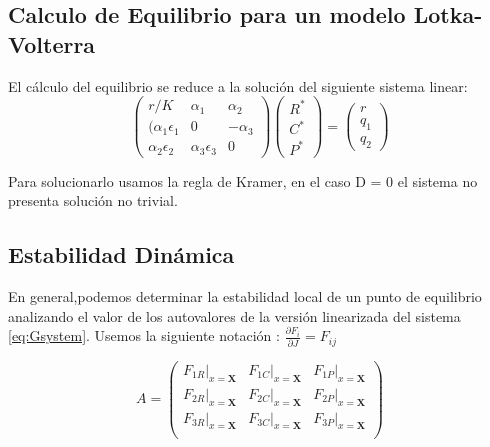 \subsection{Calculo de Equilibrio para un modelo Lotka-Volterra}\label{subsec:equil}
El c\'alculo del equilibrio se reduce a la soluci\'on del siguiente sistema linear:
\begin{equation}
\begin{pmatrix}
r/K & \alpha_1 & \alpha_2 \\
(\alpha_1\epsilon_1& 0 & -\alpha_3 \\
\alpha_2 \epsilon_2 & \alpha_3 \epsilon_3 & 0
\end{pmatrix}
\begin{pmatrix}
R^* \\
C^* \\
P^* 
\end{pmatrix}
=
\begin{pmatrix}
r \\
q_1 \\
q_2
\end{pmatrix}
\end{equation}

Para solucionarlo usamos la regla de Kramer, en el caso D = 0 el sistema no presenta soluci\'on no trivial.

\subsection{Estabilidad Din\'amica}\label{subsec:stab}
En general,podemos determinar la estabilidad local de un punto de equilibrio analizando el valor de los autovalores de la versi\'on linearizada del sistema \eqref{eq:Gsystem}. \citep{yodzis1989introduction}
Usemos la siguiente notaci\'on : $ \frac{\partial F_i}{\partial J} = F_{ij} $

\begin{equation} \label{eq:linver}
A = \begin{pmatrix}
\left. F_{1R} \right|_{x=\mathbf{X}}& \left.F_{1C}\right|_{x=\mathbf{X}}&\left.F_{1P}\right|_{x=\mathbf{X}}\\
\left. F_{2R}\right|_{x=\mathbf{X}}& \left.F_{2C}\right|_{x=\mathbf{X}}&\left.F_{2P}\right|_{x=\mathbf{X}}\\
\left. F_{3R}\right|_{x=\mathbf{X}}& \left.F_{3C}\right|_{x=\mathbf{X}}&\left.F_{3P}\right|_{x=\mathbf{X}}\\
\end{pmatrix}
\end{equation}

